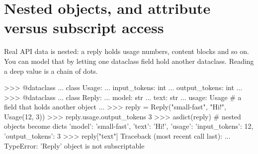 \section{Nested objects, and attribute versus subscript access}

Real API data is nested: a reply holds usage numbers, content blocks and so on. You can model
that by letting one dataclass field hold another dataclass. Reading a deep value is a chain of
dots.

\begin{center}
\end{center}

\begin{pycode}
>>> @dataclass
... class Usage:
...     input_tokens: int
...     output_tokens: int
...
>>> @dataclass
... class Reply:
...     model: str
...     text: str
...     usage: Usage                       # a field that holds another object
...
>>> reply = Reply("small-fast", "Hi!", Usage(12, 3))
>>> reply.usage.output_tokens
3
>>> asdict(reply)                          # nested objects become dicts
{'model': 'small-fast', 'text': 'Hi!',
 'usage': {'input_tokens': 12, 'output_tokens': 3}}
>>> reply["text"]
Traceback (most recent call last):
  ...
TypeError: 'Reply' object is not subscriptable
\end{pycode}

